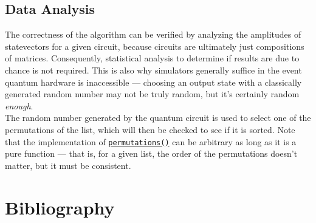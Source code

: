 \documentclass[12pt]{article}
\begin{document}
\subsection{Data Analysis}
The correctness of the algorithm can be verified by analyzing the amplitudes of statevectors for a given circuit, because circuits are ultimately just compositions of matrices. Consequently, statistical analysis to determine if results are due to chance is not required. This is also why simulators generally suffice in the event quantum hardware is inaccessible --- choosing an output state with a classically generated random number may not be truly random, but it's certainly random \textit{enough}.  \\
The random number generated by the quantum circuit is used to select one of the permutations of the list, which will then be checked to see if it is sorted. Note that the implementation of \href{https://docs.python.org/3/library/itertools.html?highlight=permutation#itertools.permutations}{\texttt{permutations()}} can be arbitrary as long as it is a pure function --- that is, for a given list, the order of the permutations doesn't matter, but it must be consistent.


\section{Bibliography}

\nocite{*}

\end{document}
